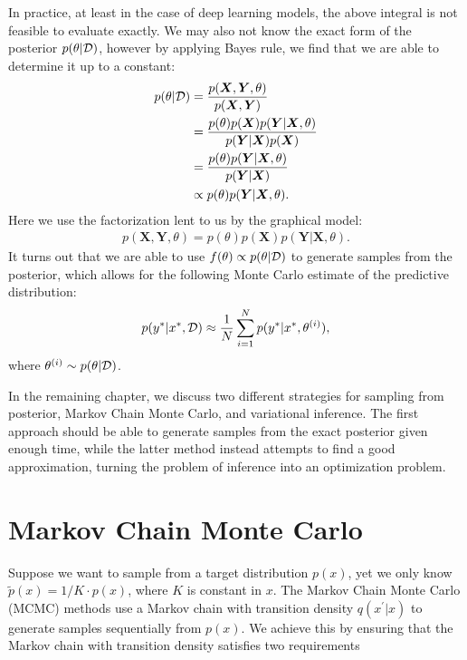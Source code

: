 In practice, at least in the case of deep learning models, the above integral is not feasible to evaluate exactly.
We may also not know the exact form of the posterior $p(\theta|\mathcal{D})$, however by applying Bayes rule, we find that we are able to determine it up to a constant:
\begin{equation} \label{eq:posterior}
    \begin{aligned}
        p(\theta | \mathcal{D}) 
        &= \frac{p(\bm X , \bm Y, \theta)}{p(\bm{X}, \bm{Y})}\\
        &= \frac{p(\theta) p(\bm X) p(\bm Y | \bm X, \theta)}{p(\bm{Y}|\bm{X})p(\bm{X})} \\
        &= \frac{p(\theta) p(\bm Y | \bm X, \theta)}{p(\bm{Y}|\bm{X})} \\
        &\propto p(\theta) p(\bm Y | \bm X, \theta).
    \end{aligned}
\end{equation}
Here we use the factorization lent to us by the graphical model:
\begin{align}
    p(\bm X, \bm Y, \theta) = p(\theta) p(\bm X) p(\bm Y | \bm X, \theta).
\end{align}
It turns out that we are able to use $f(\theta) \propto p(\theta | \mathcal{D})$ to generate samples from the posterior, which allows for the following Monte Carlo estimate of the predictive distribution:
\begin{align}
    p(y^\ast | x^\ast, \mathcal{D})  \approx \frac{1}{N} \sum_{i=1}^N p(y^\ast | x^\ast, \theta^{(i)}),
\end{align}
where $\theta^{(i)}\sim p(\theta | \mathcal{D})$.

In the remaining chapter, we discuss two different strategies for sampling from posterior, Markov Chain Monte Carlo, and variational inference.
The first approach should be able to generate samples from the exact posterior given enough time, while the latter method instead attempts to find a good approximation, turning the problem of inference into an optimization problem.

\section{Markov Chain Monte Carlo}
Suppose we want to sample from a target distribution $p(x)$, yet we only know $\tilde{p}(x) = 1/K\cdot p(x)$, where $K$ is constant in $x$.
The Markov Chain Monte Carlo (MCMC) methods use a Markov chain with transition density $q(x^\prime | x)$ to generate samples sequentially from $p(x)$. 
We achieve this by ensuring that the Markov chain with transition density satisfies two requirements


